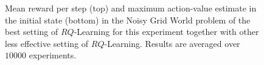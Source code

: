 \begin{figure}[t]
\begin{minipage}{\columnwidth}
\end{minipage}
  \caption[Noisy grid world $RQ$-Learning variants comparison - 1]{Mean reward per step (top) and maximum action-value estimate in the initial state (bottom) in the Noisy Grid World problem of the best setting of $RQ$-Learning for this experiment together with other less effective setting of $RQ$-Learning. Results are averaged over $10000$ experiments.}
  \label{F:hasselt_QDecs}
\end{figure}
